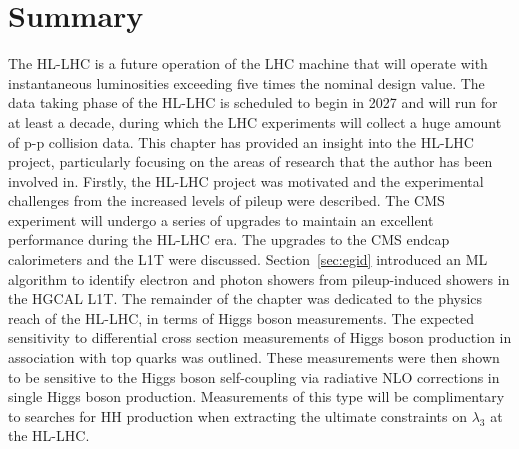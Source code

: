 \section{Summary}
The HL-LHC is a future operation of the LHC machine that will operate with instantaneous luminosities exceeding five times the nominal design value. The data taking phase of the HL-LHC is scheduled to begin in 2027 and will run for at least a decade, during which the LHC experiments will collect a huge amount of p-p collision data. This chapter has provided an insight into the HL-LHC project, particularly focusing on the areas of research that the author has been involved in. Firstly, the HL-LHC project was motivated and the experimental challenges from the increased levels of pileup were described. The CMS experiment will undergo a series of upgrades to maintain an excellent performance during the HL-LHC era. The upgrades to the CMS endcap calorimeters and the L1T were discussed. Section~\ref{sec:egid} introduced an ML algorithm to identify electron and photon showers from pileup-induced showers in the HGCAL L1T. The remainder of the chapter was dedicated to the physics reach of the HL-LHC, in terms of Higgs boson measurements. The expected sensitivity to differential cross section measurements of Higgs boson production in association with top quarks was outlined. These measurements were then shown to be sensitive to the Higgs boson self-coupling via radiative NLO corrections in single Higgs boson production. Measurements of this type will be complimentary to searches for HH production when extracting the ultimate constraints on $\lambda_3$ at the HL-LHC.